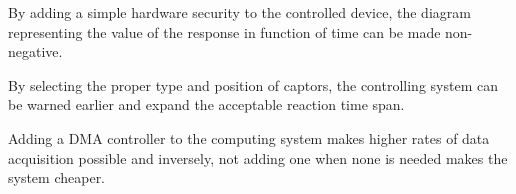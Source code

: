 \documentclass[../main.tex]{subfiles}
\begin{document}
\begin{exmp}
By adding a simple hardware security to the controlled device, the diagram representing the value of the response in function of time can be made non-negative.
\end{exmp}

\begin{exmp}
By selecting the proper type and position of captors, the controlling system can be warned earlier and expand the acceptable reaction time span.
\end{exmp}

\begin{exmp}
Adding a DMA controller to the computing system makes higher rates of data acquisition possible and inversely, not adding one when none is needed makes the system cheaper.
\end{exmp}
\end{document}
